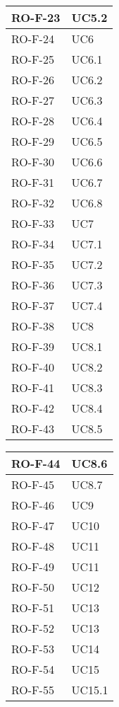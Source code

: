 \begin{center}
\begin{tabular}{ |m{8em}|m{13em}| }
    \hline
    RO-F-23  &  UC5.2 \\
    \hline
    RO-F-24  &  UC6 \\
    \hline
    RO-F-25  &  UC6.1 \\
    \hline
    RO-F-26  &  UC6.2 \\
    \hline
    RO-F-27  &  UC6.3 \\
    \hline
    RO-F-28  &  UC6.4 \\
    \hline
    RO-F-29  &  UC6.5 \\
    \hline
    RO-F-30  &  UC6.6 \\
    \hline
    RO-F-31  &  UC6.7 \\
    \hline
    RO-F-32  &  UC6.8 \\
    \hline
    RO-F-33  &  UC7 \\
    \hline
    RO-F-34  &  UC7.1 \\
    \hline
    RO-F-35  &  UC7.2 \\
    \hline
    RO-F-36  &  UC7.3 \\
    \hline
    RO-F-37  &  UC7.4 \\
    \hline
    RO-F-38  &  UC8 \\
    \hline
    RO-F-39  &  UC8.1 \\
    \hline
    RO-F-40  &  UC8.2 \\
    \hline
    RO-F-41  &  UC8.3 \\
    \hline
    RO-F-42  &  UC8.4 \\
    \hline
    RO-F-43  &  UC8.5 \\
    \hline
    \end{tabular}
    \newpage
    \begin{tabular}{ |m{8em}|m{13em}| }
    \hline
    RO-F-44  &  UC8.6 \\
    \hline
    RO-F-45  &  UC8.7 \\
    \hline
    RO-F-46  &  UC9 \\
    \hline
    RO-F-47  &  UC10 \\
    \hline
    RO-F-48  &  UC11 \\
    \hline
    RO-F-49  &  UC11 \\
    \hline
    RO-F-50  &  UC12 \\
    \hline
    RO-F-51  &  UC13 \\
    \hline
    RO-F-52  &  UC13 \\
    \hline
    RO-F-53  &  UC14 \\
    \hline
    RO-F-54  &  UC15 \\
    \hline
    RO-F-55  &  UC15.1 \\

\end{tabular}
\end{center}
